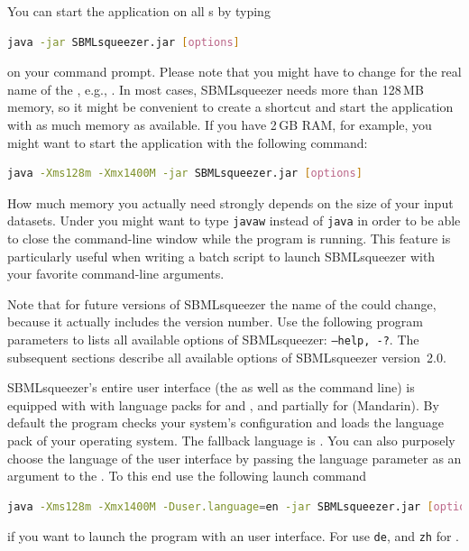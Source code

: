 You can start the application on all {\OS}s by typing
\begin{lstlisting}[language=bash, numbers=none, caption={Launching SBMLsqueezer from the command-line}]
java -jar SBMLsqueezer.jar [options]
\end{lstlisting}
on your command prompt. Please note that you might have to change
 for the real name of the \JAR, e.g.,
.
In most cases, SBMLsqueezer needs more than 128\,MB memory, so it might be convenient to create a
shortcut and start the application with as much memory as available. If you
have 2\,GB RAM, for example, you might want to start the application with the
following command:
\begin{lstlisting}[language=bash, numbers=none, caption={Launching SBMLsqueezer from the command-line with increasd heap size}]
java -Xms128m -Xmx1400M -jar SBMLsqueezer.jar [options]
\end{lstlisting}
How much memory you actually need strongly depends on the size of your input datasets.
Under \Windows you might want to type \texttt{javaw} instead of \texttt{java} in order to be able to close
the command-line window while the program is running.
This feature is particularly useful when writing a batch script to launch SBMLsqueezer with your favorite command-line arguments.

Note that for future versions of SBMLsqueezer the name of the
\JAR could change, because it actually includes the version number.
Use the following program parameters to lists all available options of
SBMLsqueezer: \texttt{--help, -?}.
The subsequent sections describe all available options of SBMLsqueezer
version~2.0.

SBMLsqueezer's entire user interface (the \GUI as well as the command line) is equipped
with with language packs for \German and \English, and partially for \Chinese (Mandarin).
By default the program checks your system's configuration and loads the language pack of
your operating system.
The fallback language is \English.
You can also purposely choose the language of the user interface by passing the language parameter as an
argument to the \JVM.
To this end use the following launch command
\begin{lstlisting}[language=bash, numbers=none, caption={Launching SBMLsqueezer with an alternative language pack}]
java -Xms128m -Xmx1400M -Duser.language=en -jar SBMLsqueezer.jar [options]
\end{lstlisting}
if you want to launch the program with an \English user interface.
For \German use \texttt{de}, and \texttt{zh} for \Chinese.

